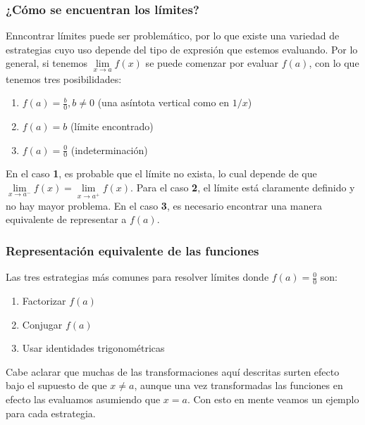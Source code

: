 \documentclass[
]{book}
\providecommand{\tightlist}{%
  \setlength{\itemsep}{0pt}\setlength{\parskip}{0pt}}
\begin{document}
\hypertarget{cuxf3mo-se-encuentran-los-luxedmites}{%
\subsubsection{¿Cómo se encuentran los límites?}\label{cuxf3mo-se-encuentran-los-luxedmites}}

Enncontrar límites puede ser problemático, por lo que existe una variedad de estrategias cuyo uso depende del tipo de expresión que estemos evaluando. Por lo general, si tenemos \(\lim\limits_{x \rightarrow a} f(x)\) se puede comenzar por evaluar \(f(a)\), con lo que tenemos tres posibilidades:

\begin{enumerate}
\def\labelenumi{\arabic{enumi}.}
\tightlist
\item
  \(f(a) = \frac{b}{0}, b \neq 0\) (una asíntota vertical como en \(1/x\))
\item
  \(f(a) = b\) (límite encontrado)
\item
  \(f(a) = \frac{0}{0}\) (indeterminación)
\end{enumerate}

En el caso \textbf{1}, es probable que el límite no exista, lo cual depende de que \(\lim\limits_{x \rightarrow a^-} f(x) = \lim\limits_{x \rightarrow a^+} f(x)\). Para el caso \textbf{2}, el límite está claramente definido y no hay mayor problema. En el caso \textbf{3}, es necesario encontrar una manera equivalente de representar a \(f(a)\).

\hypertarget{representaciuxf3n-equivalente-de-las-funciones}{%
\subsubsection{Representación equivalente de las funciones}\label{representaciuxf3n-equivalente-de-las-funciones}}

Las tres estrategias más comunes para resolver límites donde \(f(a) = \frac{0}{0}\) son:

\begin{enumerate}
\def\labelenumi{\arabic{enumi}.}
\tightlist
\item
  Factorizar \(f(a)\)
\item
  Conjugar \(f(a)\)
\item
  Usar identidades trigonométricas
\end{enumerate}

Cabe aclarar que muchas de las transformaciones aquí descritas surten efecto bajo el supuesto de que \(x \neq a\), aunque una vez transformadas las funciones en efecto las evaluamos asumiendo que \(x = a\). Con esto en mente veamos un ejemplo para cada estrategia.
\end{document}
